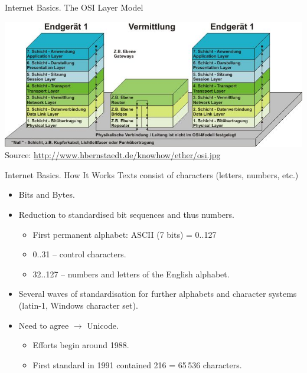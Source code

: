 \documentclass{beamer}
\begin{document}
\begin{frame}{Internet Basics. The OSI Layer Model}
  \begin{center}\small
    \includegraphics[width=\textwidth]{HhBzfw.jpg}\\
    Source: \url{http://www.hbernstaedt.de/knowhow/ether/osi.jpg}
  \end{center}
\end{frame}
\begin{frame}{Internet Basics. How It Works}
Texts consist of characters (letters, numbers, etc.)
\begin{itemize}
\item Bits and Bytes.
\item Reduction to standardised bit sequences and thus numbers.
  \begin{itemize}
  \item First permanent alphabet: ASCII (7 bits) = 0..127
  \item 0..31 -- control characters.
  \item 32..127 -- numbers and letters of the English alphabet.
  \end{itemize}
\item Several waves of standardisation for further alphabets and character
  systems (latin-1, Windows character set).
\item Need to agree $\to$ Unicode.
  \begin{itemize}
  \item Efforts begin around 1988.
  \item First standard in 1991 contained 216 = 65\,536 characters.
  \end{itemize}
\end{itemize}
\end{frame}
\end{document}
